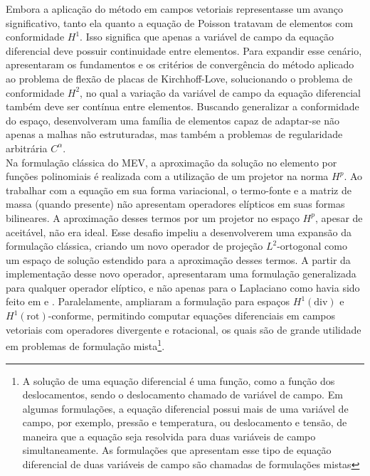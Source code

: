 \indent Embora a aplicação do método em campos vetoriais representasse um avanço significativo, tanto ela quanto a equação de Poisson tratavam de elementos com conformidade $H^1$. Isso significa que apenas a variável de campo da equação diferencial deve possuir continuidade entre elementos. Para expandir esse cenário, \citet{virtualelementmethodsplatebendingproblems2013a} apresentaram os fundamentos e os critérios de convergência do método aplicado ao problema de flexão de placas de Kirchhoff-Love, solucionando o problema de conformidade $H^2$, no qual a variação da variável de campo da equação diferencial também deve ser contínua entre elementos. Buscando generalizar a conformidade do espaço, \citet{virtualelementmethodarbitraryregularity2014} desenvolveram uma família de elementos capaz de adaptar-se não apenas a malhas não estruturadas, mas também a problemas de regularidade arbitrária $C^{\alpha}$. \\
\indent Na formulação clássica do MEV, a aproximação da solução no elemento por funções polinomiais é realizada com a utilização de um projetor na norma $H^p$. Ao trabalhar com a equação em sua forma variacional, o termo-fonte e a matriz de massa (quando presente) não apresentam operadores elípticos em suas formas bilineares. A aproximação desses termos por um projetor no espaço $H^p$, apesar de aceitável, não era ideal. Esse desafio impeliu \citet{equivalentprojectorsvirtualelementmethods2013a} a desenvolverem uma expansão da formulação clássica, criando um novo operador de projeção $L^2$-ortogonal como um espaço de solução estendido para a aproximação desses termos. A partir da implementação desse novo operador, \citet{virtualelementmethodgeneralsecondorderellipticproblemspolygonalmeshes2016} apresentaram uma formulação generalizada para qualquer operador elíptico, e não apenas para o Laplaciano como havia sido feito em \citet{basicprinciplesvirtualelementmethods2013a} e \citet{virtualelementslinearelasticityproblems2013}. Paralelamente, \citet{hdivhcurlconformingvem2014} ampliaram a formulação para espaços $H^1(\text{div})$ e $H^1(\text{rot})\text{-conforme}$, permitindo computar equações diferenciais em campos vetoriais com operadores divergente e rotacional, os quais são de grande utilidade em problemas de formulação mista\footnote{A solução de uma equação diferencial é uma função, como a função dos deslocamentos, sendo o deslocamento chamado de variável de campo. Em algumas formulações, a equação diferencial possui mais de uma variável de campo, por exemplo, pressão e temperatura, ou deslocamento e tensão, de maneira que a equação seja resolvida para duas variáveis de campo simultaneamente. As formulações que apresentam esse tipo de equação diferencial de duas variáveis de campo são chamadas de formulações mistas}.  \\
